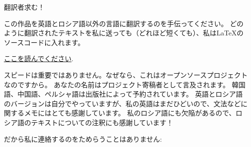 \vspace*{\fill}

\Huge 翻訳者求む！

\normalsize

\bigskip
\bigskip
\bigskip

この作品を英語とロシア語以外の言語に翻訳するのを手伝ってください。
どのように翻訳されたテキストを私に送っても（どれほど短くても）、私はLaTeXのソースコードに入れます。

\href{\RepoURL/Translation.md}{ここを読んでください}.


スピードは重要ではありません。なぜなら、これはオープンソースプロジェクトなのですから。
あなたの名前はプロジェクト寄稿者として言及されます。
韓国語、中国語、ペルシャ語は出版社によって予約されています。
英語とロシア語のバージョンは自分でやっていますが、私の英語はまだひどいので、文法などに関するメモにはとても感謝しています。
私のロシア語にも欠陥があるので、ロシア語のテキストについての注釈にも感謝しています！

だから私に連絡するのをためらうことはありません: \GTT{\EMAIL}

\vspace*{\fill}
\vfill
